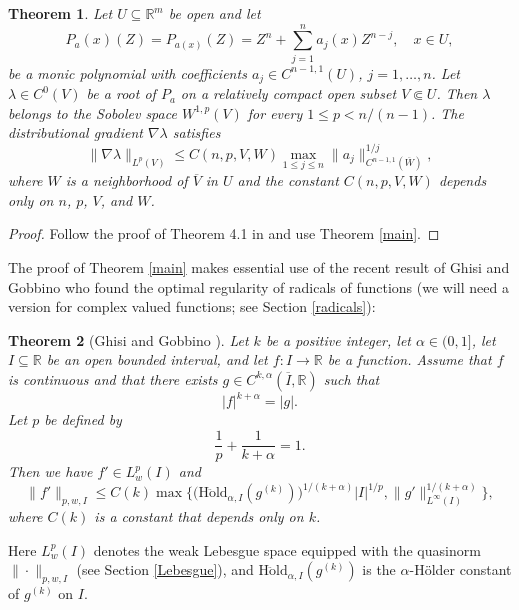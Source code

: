 \documentclass[12pt]{amsart}
\theoremstyle{plain}
\newtheorem{theorem}{Theorem}
\theoremstyle{definition}
\numberwithin{equation}{section}
\let\on=\operatorname
\begin{document}
\begin{theorem}  
  Let $U \subseteq {\mathbb{R}}^m$ be open and let  
  \[
    P_a(x)(Z)= P_{a(x)}(Z) = Z^n + \sum_{j=1}^n a_j(x) Z^{n-j}, \quad x \in U,   
  \]
  be a monic polynomial with coefficients $a_j \in C^{n-1,1}(U)$, $j = 1,\ldots,n$.   
  Let ${\lambda} \in C^0(V)$ be a root of $P_a$ on a relatively compact open subset $V \Subset U$. 
  Then ${\lambda}$ belongs to the Sobolev space $W^{1,p}(V)$ for every $1 \le p < n/(n-1)$. 
  The distributional gradient $\nabla {\lambda}$ satisfies  
  \begin{equation} \label{multbound} 
   \|\nabla {\lambda} \|_{L^p(V)}  \le  C(n,p,V,W) \max_{1 \le j \le n} \|a_j\|^{1/j}_{C^{n-1,1}(\overline W)},
  \end{equation}
  where $W$ is a neighborhood of $\overline V$ in $U$ and 
  the constant $C(n,p,V,W)$ depends only on $n$, $p$, $V$, and $W$.   
\end{theorem}

\begin{proof}
  Follow the proof of Theorem 4.1 in \cite{ParusinskiRainerAC} and use Theorem \ref{main}.
\end{proof}

The proof of Theorem \ref{main} makes essential use of the recent result of Ghisi and Gobbino \cite{GhisiGobbino13} 
who found the optimal regularity of radicals of functions (we will need a version for complex valued functions; see Section \ref{radicals}):

\begin{theorem}[Ghisi and Gobbino \cite{GhisiGobbino13}] \label{GhisiGobbino}
  Let $k$ be a positive integer, let ${\alpha} \in (0,1]$, let $I \subseteq {\mathbb{R}}$ be an open bounded interval, and let $f : I \to {\mathbb{R}}$ 
  be a function.
  Assume that $f$ is continuous and that there exists $g \in C^{k,{\alpha}}({\overline I},{\mathbb{R}})$ such that 
  \[
    |f|^{k +{\alpha}} = |g|.
  \]
  Let $p$ be defined by 
  \[
    \frac 1 p + \frac 1 {k+{\alpha}} =1.
  \]
  Then we have $f' \in L^p_w(I)$ and 
  \begin{equation} \label{GG}
    \|f'\|_{p,w,I} \le 
    C(k) \max\Big\{\big({\on{H\ddot{o}ld}}_{{\alpha},I}(g^{(k)})\big)^{1/(k+{\alpha})}|I|^{1/p}, 
    \|g'\|_{L^\infty(I)}^{1/(k+{\alpha})}\Big\}, 
  \end{equation}
  where $C(k)$ is a constant that depends only on $k$.
\end{theorem}

Here $L^p_w(I)$ denotes the weak Lebesgue space equipped with the quasinorm $\|\cdot\|_{p,w,I}$ (see Section \ref{Lebesgue}), 
and ${\on{H\ddot{o}ld}}_{{\alpha},I}(g^{(k)})$ is the ${\alpha}$-H\"older constant of $g^{(k)}$ on $I$. 
\end{document}
